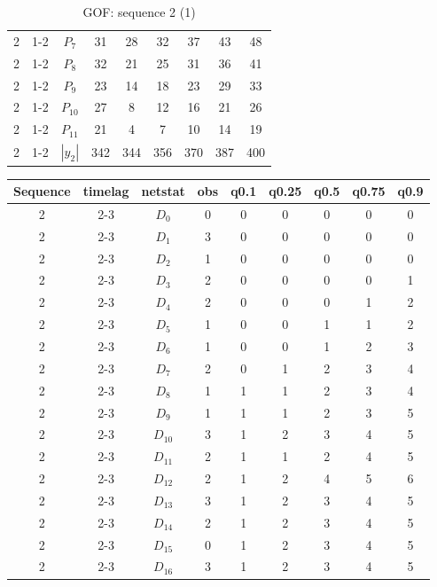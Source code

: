 \documentclass[aspectratio=169,ignorenonframetext,9pt]{beamer}
\theoremstyle{plain}
\theoremstyle{definition}
\begin{document}
\begin{table}[h!]
\begin{tabular}{c| c | c | c | c |c |c |c |c }
            2 & 1-2 & $P_7$ & 31 & 28& 32& 37& 43& 48 \\
            2 & 1-2 & $P_8$ & 32 & 21& 25& 31& 36& 41 \\
            2 & 1-2 & $P_9$ & 23 & 14& 18& 23& 29& 33 \\
            2 & 1-2 & $P_{10}$ & 27 & 8& 12& 16& 21& 26 \\
            2 & 1-2 & $P_{11}$ & 21 & 4& 7& 10& 14& 19 \\
            2 & 1-2 & $|y_2|$ & 342 &  344& 356& 370& 387& 400 \\
        \end{tabular}
        \caption{GOF: sequence 2 (1)}
    \end{table}
\clearpage
\begin{table}[h!]
    \centering
        \begin{tabular}{c| c | c | c | c |c |c |c |c }
            Sequence& timelag & netstat & obs & q0.1 & q0.25 & q0.5 & q0.75 & q0.9 \\
            \hline \hline
            2 & 2-3 & $D_0$ & 0 &  0& 0& 0& 0& 0 \\
            2 & 2-3 & $D_1$ & 3 &  0& 0& 0& 0& 0 \\
            2 & 2-3 & $D_2$ & 1 &  0& 0& 0& 0& 0 \\
            2 & 2-3 & $D_3$ & 2 &  0& 0& 0& 0& 1 \\
            2 & 2-3 & $D_4$ & 2 &  0& 0& 0& 1& 2 \\
            2 & 2-3 & $D_5$ & 1 &  0& 0& 1& 1& 2 \\
            2 & 2-3 & $D_6$ & 1 &  0& 0& 1& 2& 3 \\
            2 & 2-3 & $D_7$ & 2 &  0& 1& 2& 3& 4 \\
            2 & 2-3 & $D_8$ & 1 &  1& 1& 2& 3& 4 \\
            2 & 2-3 & $D_9$ & 1 &  1& 1& 2& 3& 5 \\
            2 & 2-3 & $D_{10}$ & 3 &  1& 2& 3& 4& 5 \\
            2 & 2-3 & $D_{11}$ & 2 &  1& 1& 2& 4& 5 \\
            2 & 2-3 & $D_{12}$ & 2 &  1& 2& 4& 5& 6 \\
            2 & 2-3 & $D_{13}$ & 3 &  1& 2& 3& 4& 5 \\
            2 & 2-3 & $D_{14}$ & 2 &  1& 2& 3& 4& 5 \\
            2 & 2-3 & $D_{15}$ & 0 &  1& 2& 3& 4& 5 \\
            2 & 2-3 & $D_{16}$ & 3 &  1& 2& 3& 4& 5 \\

\end{tabular}
\end{table}
\end{document}
